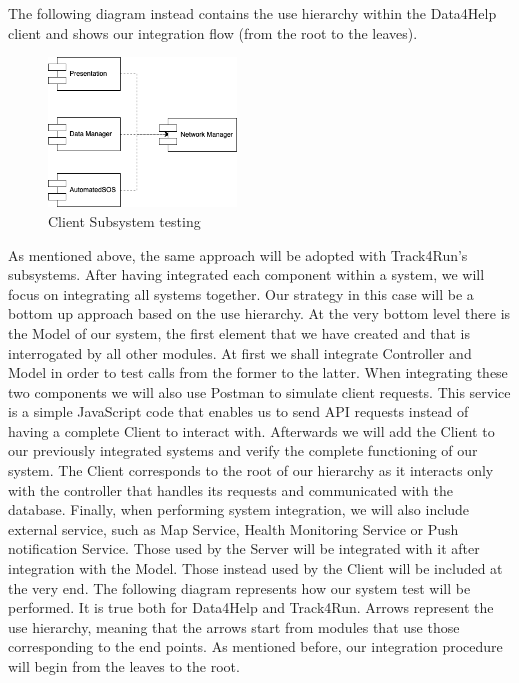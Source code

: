 \documentclass[titlepage]{article}
\begin{document}
The following diagram instead contains the use hierarchy within the Data4Help client and shows our integration flow (from the root to the leaves).
\begin{figure}[H]
	\center
  	\includegraphics[width=5cm]{clientSubsystemTesting.png}
  	\caption{Client Subsystem testing}
 	\label{fig:clientSubsystemTesting}
\end{figure}
As mentioned above, the same approach will be adopted with Track4Run’s subsystems.
\newline
\newline
After having integrated each component within a system, we will focus on integrating all systems together. Our strategy in this case will be a bottom up approach based on the use hierarchy. At the very bottom level there is the Model of our system, the first element that we have created and that is interrogated by all other modules. At first we shall integrate Controller and Model in order to test calls from the former to the latter. When integrating these two components we will also use Postman to simulate client requests. This service is a simple JavaScript code that enables us to send API requests instead of having a complete Client to interact with. 
Afterwards we will add the Client to our previously integrated systems and verify the complete functioning of our system. The Client corresponds to the root of our hierarchy as it interacts only with the controller that handles its requests and communicated with the database.
Finally, when performing system integration, we will also include external service, such as Map Service, Health Monitoring Service or Push notification Service. Those used by the Server will be integrated with it after integration with the Model. Those instead used by the Client will be included at the very end.
\newline
\newline
The following diagram represents how our system test will be performed. It is true both for Data4Help and Track4Run. Arrows represent the use hierarchy, meaning that the arrows start from modules that use those corresponding to the end points. As mentioned before, our integration procedure will begin from the leaves to the root.
\end{document}
